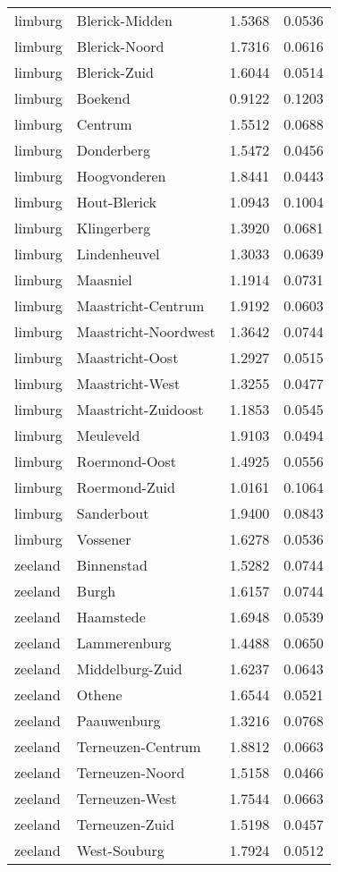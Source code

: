 \begin{longtable}{llcc}
limburg & Blerick-Midden & 1.5368 & 0.0536 \\
limburg & Blerick-Noord & 1.7316 & 0.0616 \\
limburg & Blerick-Zuid & 1.6044 & 0.0514 \\
limburg & Boekend & 0.9122 & 0.1203 \\
limburg & Centrum & 1.5512 & 0.0688 \\
limburg & Donderberg & 1.5472 & 0.0456 \\
limburg & Hoogvonderen & 1.8441 & 0.0443 \\
limburg & Hout-Blerick & 1.0943 & 0.1004 \\
limburg & Klingerberg & 1.3920 & 0.0681 \\
limburg & Lindenheuvel & 1.3033 & 0.0639 \\
limburg & Maasniel & 1.1914 & 0.0731 \\
limburg & Maastricht-Centrum & 1.9192 & 0.0603 \\
limburg & Maastricht-Noordwest & 1.3642 & 0.0744 \\
limburg & Maastricht-Oost & 1.2927 & 0.0515 \\
limburg & Maastricht-West & 1.3255 & 0.0477 \\
limburg & Maastricht-Zuidoost & 1.1853 & 0.0545 \\
limburg & Meuleveld & 1.9103 & 0.0494 \\
limburg & Roermond-Oost & 1.4925 & 0.0556 \\
limburg & Roermond-Zuid & 1.0161 & 0.1064 \\
limburg & Sanderbout & 1.9400 & 0.0843 \\
limburg & Vossener & 1.6278 & 0.0536 \\
zeeland & Binnenstad & 1.5282 & 0.0744 \\
zeeland & Burgh & 1.6157 & 0.0744 \\
zeeland & Haamstede & 1.6948 & 0.0539 \\
zeeland & Lammerenburg & 1.4488 & 0.0650 \\
zeeland & Middelburg-Zuid & 1.6237 & 0.0643 \\
zeeland & Othene & 1.6544 & 0.0521 \\
zeeland & Paauwenburg & 1.3216 & 0.0768 \\
zeeland & Terneuzen-Centrum & 1.8812 & 0.0663 \\
zeeland & Terneuzen-Noord & 1.5158 & 0.0466 \\
zeeland & Terneuzen-West & 1.7544 & 0.0663 \\
zeeland & Terneuzen-Zuid & 1.5198 & 0.0457 \\
zeeland & West-Souburg & 1.7924 & 0.0512 \\
\hline
\end{longtable}
